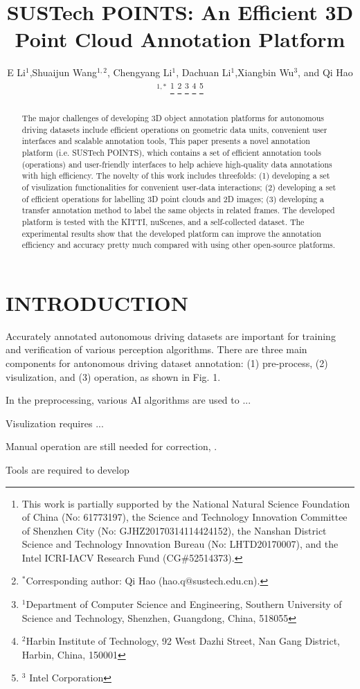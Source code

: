 \documentclass[letterpaper, 10 pt, conference]{ieeeconf}  %
\title{\LARGE \bf
SUSTech POINTS: An Efficient 3D Point Cloud Annotation Platform
}
\author{E Li$^{1}$,Shuaijun Wang$^{1,2}$,  Chengyang Li$^{1}$, Dachuan Li$^{1}$,Xiangbin Wu$^{3}$, and Qi Hao$^{1,*}$%
\thanks{This work is partially supported by the National Natural Science Foundation of China (No: 61773197), the Science and Technology Innovation Committee of Shenzhen City (No: GJHZ20170314114424152), the Nanshan District Science and Technology Innovation Bureau (No: LHTD20170007), and the Intel ICRI-IACV Research Fund (CG$\#$52514373).}
\thanks{$^{*}$Corresponding author: Qi Hao (hao.q@sustech.edu.cn).}
\thanks{$^{1}$Department of Computer Science and Engineering,
Southern University of Science and Technology, Shenzhen, Guangdong, China, 518055}
\thanks{$^{2}$Harbin Institute of Technology,
92 West Dazhi Street, Nan Gang District, Harbin, China, 150001}%
\thanks{$^{3}$ Intel Corporation}%
}
\begin{document}
\maketitle
\thispagestyle{empty}
\pagestyle{empty}
\begin{abstract}
The major challenges of developing 3D object annotation platforms for autonomous driving datasets 
include efficient operations on geometric data units, convenient user interfaces and scalable annotation tools, This paper presents a novel annotation platform (i.e. SUSTech POINTS), which contains a set of efficient annotation tools (operations) and user-friendly interfaces to help achieve high-quality data annotations with high efficiency.
The novelty of this work includes threefolds: 
(1) developing a set of visulization functionalities for convenient user-data interactions;
(2) developing a set of efficient operations for labelling 3D point clouds and 2D images; 
(3) developing a transfer annotation method to label the same objects in related frames. 
The developed platform is tested with the KITTI, nuScenes, and a self-collected dataset. 
The experimental results show that the developed platform can improve the annotation efficiency and accuracy pretty much 
compared with using other open-source platforms.
\end{abstract}






\section{INTRODUCTION}

Accurately annotated autonomous driving datasets are important for training and verification of various perception algorithms.
There are three main components for antonomous driving dataset annotation: (1) pre-process, (2) visulization, and (3) operation, as shown in Fig. 1.

In the preprocessing, various AI algorithms are used to ...

Visulization requires ...

Manual operation are still needed for correction, . 


Tools are required to develop 
\end{document}

